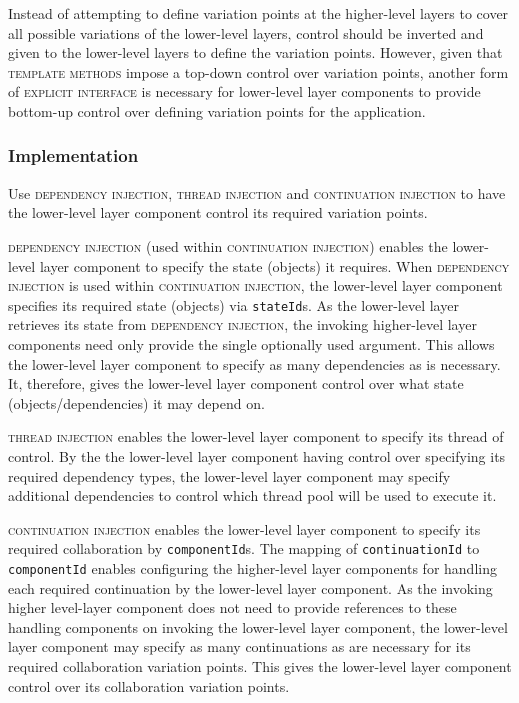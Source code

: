 \documentclass[prodmode]{style/acmlarge}
\begin{document}
Instead of attempting to define variation points at the higher-level layers to cover
all possible variations of the lower-level layers, control should be inverted and
given to the lower-level layers to define the variation points.  However, given
that \textsc{template methods} impose a top-down control over variation points,
another form of \textsc{explicit interface} is necessary for lower-level layer
components to provide bottom-up control over defining variation points for the
application.


\subsubsection*{Implementation}

Use \textsc{dependency injection}, \textsc{thread injection} and
\textsc{continuation injection} to have the lower-level layer component control
its required variation points.

\textsc{dependency injection} \cite{ioc} (used within \textsc{continuation
injection}) enables the lower-level layer component to specify the state
(objects) it requires.  When \textsc{dependency injection} is used within
\textsc{continuation injection}, the lower-level layer component specifies its
required state (objects) via \texttt{stateId}s.  As the lower-level layer
retrieves its state from \textsc{dependency injection}, the invoking
higher-level layer components need only provide the single optionally used
argument.  This allows the lower-level layer component to specify as many
dependencies as is necessary.  It, therefore, gives the lower-level layer component
control over what state (objects/dependencies) it may depend on.

\textsc{thread injection} enables the lower-level layer component to specify its
thread of control.  By the the lower-level layer component having control over
specifying its required dependency types, the lower-level layer component may
specify additional dependencies to control which thread pool will be used to
execute it.

\textsc{continuation injection} enables the lower-level layer component to
specify its required collaboration by \texttt{componentId}s.  The mapping of
\texttt{continuationId} to \texttt{componentId} enables configuring the
higher-level layer components for handling each required continuation by the
lower-level layer component.  As the invoking higher level-layer component does
not need to provide references to these handling components on invoking the
lower-level layer component, the lower-level layer component may specify as many
continuations as are necessary for its required collaboration variation points. 
This gives the lower-level layer component control over its collaboration
variation points.
\end{document}
